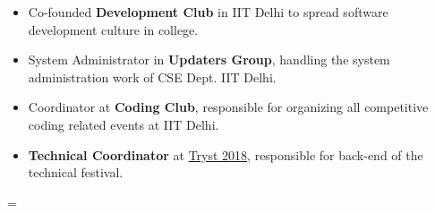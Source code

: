 \documentclass{article}
\newenvironment{absolutelynopagebreak}
  {\par\nobreak\vfil\penalty0\vfilneg
   \vtop\bgroup}
  {\par\xdef\tpd{\the\prevdepth}\egroup
   \prevdepth=\tpd}
\begin{document}
\begin{absolutelynopagebreak}
\begin{itemize}
    \setlength\itemsep{0em}
    \item Co-founded \textbf{Development Club} in IIT Delhi to spread software development culture in college.
    \item System Administrator in \textbf{Updaters Group}, handling the system administration work of CSE Dept. IIT Delhi.
    \item Coordinator at \textbf{Coding Club}, responsible for organizing all competitive coding related events at IIT Delhi.
    \item \textbf{Technical Coordinator} at \href{http://tryst-iitd.com/}{Tryst 2018}, responsible for back-end of the technical festival.
     
\end{itemize}
\end{absolutelynopagebreak}
\end{document}
